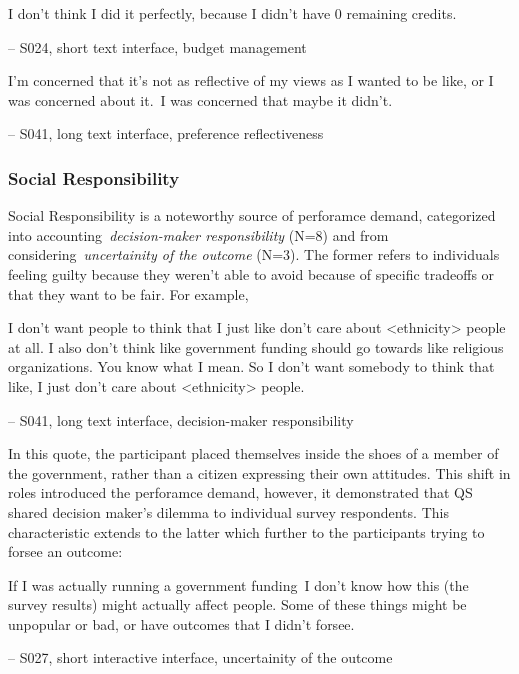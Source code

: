 \begin{displayquote}
I don't think I did it perfectly, because I didn't have 0 remaining credits.
    
\noindent \hfill -- S024, short text interface, budget management
\end{displayquote}

\begin{displayquote}
I'm concerned that it's not as reflective of my views as I wanted to be like, or I was concerned about it.~\bracketellipsis I was concerned that maybe it didn't.

\noindent \hfill -- S041, long text interface, preference reflectiveness
\end{displayquote}

\subsubsection{Social Responsibility}
Social Responsibility is a noteworthy source of perforamce demand, categorized into accounting~\textit{decision-maker responsibility} (N=8) and from considering~\textit{uncertainity of the outcome} (N=3). The former refers to individuals feeling guilty because they weren't able to avoid because of specific tradeoffs or that they want to be fair. For example, 

\begin{displayquote}
I don't want people to think that I just like don't care about <ethnicity> people at all. I also don't think like government funding should go towards like religious organizations. You know what I mean. So I don't want somebody to think that like, I just don't care about <ethnicity> people.
    
\noindent \hfill -- S041, long text interface, decision-maker responsibility
\end{displayquote}

In this quote, the participant placed themselves inside the shoes of a member of the government, rather than a citizen expressing their own attitudes. This shift in roles introduced the perforamce demand, however, it demonstrated that QS shared decision maker's dilemma to individual survey respondents. This characteristic extends to the latter which further to the participants trying to forsee an outcome:

\begin{displayquote}
If I was actually running a government funding~\bracketellipsis I don't know how this (the survey results) might actually affect people. Some of these things might be unpopular or bad, or have outcomes that I didn't forsee.
    
\noindent \hfill -- S027, short interactive interface, uncertainity of the outcome
\end{displayquote}

